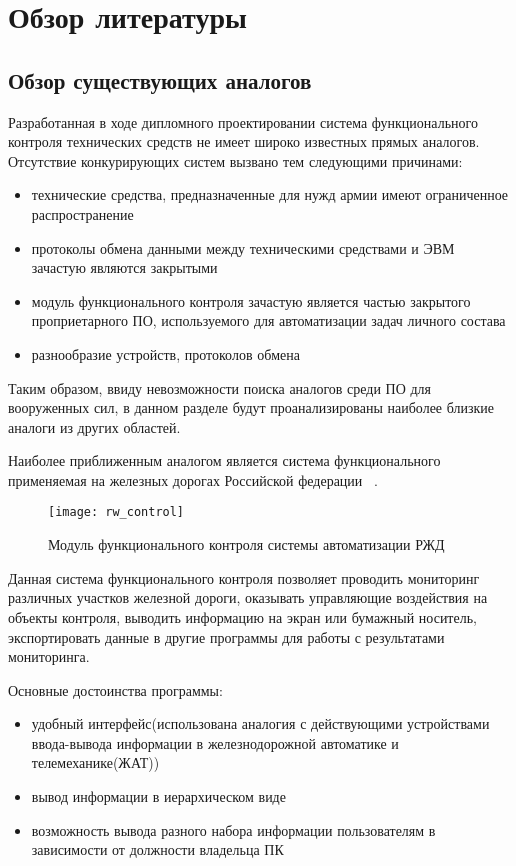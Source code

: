 \section{Обзор литературы}
\label{sec:lit_review}

\subsection{Обзор существующих аналогов}
\label{sub:lit_review:analogues}
Разработанная в ходе дипломного проектировании система функционального контроля технических средств не имеет широко
известных прямых аналогов. Отсутствие конкурирующих систем вызвано тем следующими причинами:
\begin{itemize}
	\item технические средства, предназначенные для нужд армии имеют ограниченное распространение
	\item протоколы обмена данными между техническими средствами и ЭВМ зачастую являются закрытыми
	\item модуль функционального контроля зачастую является частью закрытого проприетарного ПО, используемого для
		автоматизации задач личного состава
	\item разнообразие устройств, протоколов обмена
\end{itemize}

Таким образом, ввиду невозможности поиска аналогов среди ПО для вооруженных сил, в данном разделе будут проанализированы
наиболее близкие аналоги из других областей.

Наиболее приближенным аналогом является система функционального применяемая на железных дорогах Российской федерации
~\cite{rus_rails}.

\begin{figure}[ht]
	\centering
	\texttt{[image: rw\_control]}
	\caption{Модуль функционального контроля системы автоматизации РЖД~\cite{rus_rails}}
	\label{fig:lit_reiview:analogues:rw_control}
\end{figure}

Данная система функционального контроля позволяет проводить мониторинг различных участков железной дороги, оказывать
управляющие воздействия на объекты контроля, выводить информацию на экран или бумажный носитель, экспортировать данные в
другие программы для работы с результатами мониторинга.

Основные достоинства программы:
\begin{itemize}
	\item удобный интерфейс(использована аналогия с действующими устройствами ввода-вывода информации в
		железнодорожной автоматике и телемеханике(ЖАТ))
	\item вывод информации в иерархическом виде
	\item возможность вывода разного набора информации пользователям в зависимости от должности владельца ПК
\end{itemize}


